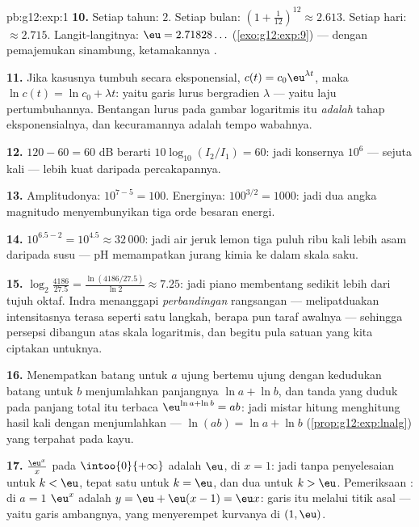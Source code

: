 \begin{solution}{pb:g12:exp:1}
\textbf{10.} Setiap tahun: $2$. Setiap bulan:
$\left(1 + \frac{1}{12}\right)^{12} \approx 2.613$. Setiap hari:
$\approx 2.715$. Langit-langitnya: $\eu = 2.71828\ldots$
(\cref{exo:g12:exp:9}) --- dengan pemajemukan sinambung, ketamakannya
.

\textbf{11.} Jika kasusnya tumbuh secara eksponensial, $c(t) = c_0
\eu^{\lambda t}$, maka $\ln c(t) = \ln c_0 + \lambda t$: yaitu
garis lurus bergradien $\lambda$ --- yaitu laju pertumbuhannya. Bentangan
lurus pada gambar logaritmis itu \emph{adalah} tahap
eksponensialnya, dan kecuramannya adalah tempo wabahnya.

\textbf{12.} $120 - 60 = 60$ dB berarti
$10\log_{10}(I_2/I_1) = 60$: jadi konsernya
$10^6$ --- sejuta kali --- lebih kuat daripada
percakapannya.

\textbf{13.} Amplitudonya: $10^{7-5} = 100$. Energinya:
$100^{3/2} = 1000$: jadi dua angka magnitudo menyembunyikan tiga orde
besaran energi.

\textbf{14.} $10^{6.5 - 2} = 10^{4.5} \approx 32\,000$: jadi air
jeruk lemon tiga puluh ribu kali lebih asam daripada susu --- pH
memampatkan jurang kimia ke dalam skala saku.

\textbf{15.} $\log_2\!\frac{4186}{27.5} =
\frac{\ln(4186/27.5)}{\ln 2} \approx 7.25$: jadi piano membentang sedikit
lebih dari tujuh oktaf. Indra menanggapi \emph{perbandingan} rangsangan
--- melipatduakan intensitasnya terasa seperti satu langkah, berapa pun
taraf awalnya --- sehingga persepsi dibangun atas skala logaritmis,
dan begitu pula satuan yang kita ciptakan untuknya.

\textbf{16.} Menempatkan batang untuk $a$ ujung bertemu ujung dengan
kedudukan batang untuk $b$ menjumlahkan panjangnya $\ln a + \ln b$, dan
tanda yang duduk pada panjang total itu terbaca
$\eu^{\ln a + \ln b} = ab$: jadi mistar hitung menghitung hasil kali
dengan menjumlahkan  --- $\ln(ab) = \ln a + \ln b$
(\cref{prop:g12:exp:lnalg}) yang terpahat pada kayu.

\textbf{17.}  $\frac{\eu^x}{x}$ pada
$\intoo{0}{+\infty}$ adalah $\eu$, di $x = 1$: jadi tanpa penyelesaian untuk
$k < \eu$, tepat satu untuk $k = \eu$, dan dua untuk $k > \eu$.
Pemeriksaan : di $a = 1$  $\eu^x$ adalah
$y = \eu + \eu(x - 1) = \eu x$: garis itu melalui titik asal
--- yaitu garis ambangnya, yang menyerempet kurvanya di $(1, \eu)$.


\end{solution}
